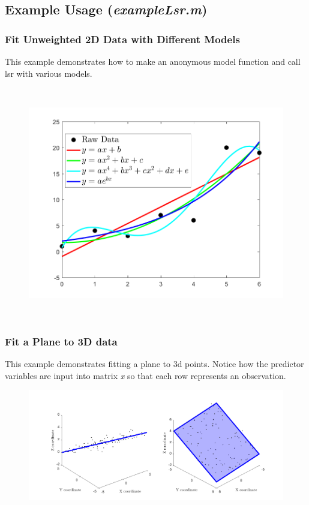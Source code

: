 \documentclass{article}
\begin{document}
	\clearpage
	\subsection*{Example Usage (\textit{exampleLsr.m})}
	\subsubsection*{Fit Unweighted 2D Data with Different Models}
	This example demonstrates how to make an anonymous model function and call lsr with various models.
	
	
	
	\begin{figure}[H]
		\centering
		\includegraphics[height = 4in]{basicUsage}
	\end{figure}
	
	\clearpage
	\subsubsection*{Fit a Plane to 3D data}
	This example demonstrates fitting a plane to 3d points.  Notice how the predictor variables are input into matrix \textit{x} so that each row represents an observation.
	
	\begin{figure}[H]
		\centering
		\includegraphics[width = \linewidth]{3dplane}
	\end{figure}
	\clearpage
\end{document}
